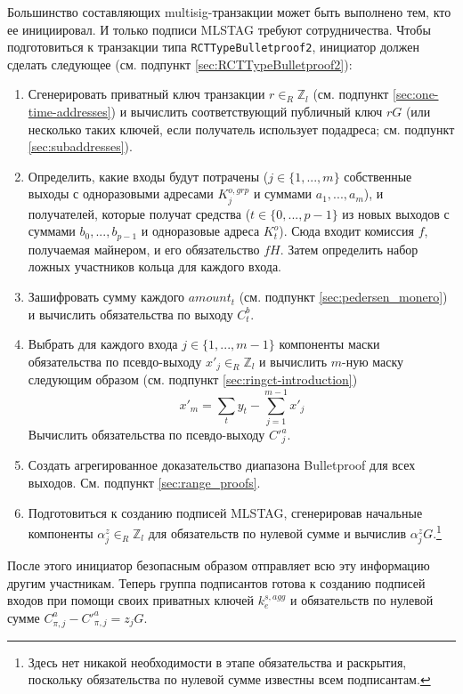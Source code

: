 Большинство составляющих multisig-транзакции может быть выполнено тем, кто ее иниции\-ровал. И только подписи MLSTAG требуют сотрудничества. Чтобы подготовиться к транзак\-ции типа {\tt RCTTypeBulletproof2}, инициатор должен сделать следующее (см. подпункт \ref{sec:RCTTypeBulletproof2}):
\begin{enumerate}
    \item Сгенерировать приватный ключ транзакции $r \in_R \mathbb{Z}_l$ (см. подпункт \ref{sec:one-time-addresses}) и вычислить соответствующий публичный ключ $r G$ (или несколько таких ключей, если получатель использует подадреса; см. подпункт \ref{sec:subaddresses}).
    \item Определить, какие входы будут потрачены ($j \in \{1,...,m\}$ собственные выходы с однора\-зовыми адресами $K^{o,grp}_j$ и суммами $a_1,...,a_m$), и получателей, которые получат средства ($t \in \{0,...,p-1\}$ из новых выходов с суммами $b_0,...,b_{p-1}$ и одноразовые адреса $K^{o}_t$). Сюда входит комиссия $f$, получаемая майнером, и его обязательство $f H$. Затем определить набор ложных участников кольца для каждого входа.
    \item Зашифровать сумму каждого $\mathit{amount}_t$ (см. подпункт \ref{sec:pedersen_monero}) и вычислить обязательства по выходу $C^b_t$.
    \item Выбрать для каждого входа $j \in \{1,...,m-1\}$ компоненты маски обязательства по псевдо-выходу $x'_{j} \in_R \mathbb{Z}_l$ и вычислить $m$-ную маску следующим образом (см. подпункт \ref{sec:ringct-introduction})
    \[x'_m = \sum_t y_t - \sum_{j=1}^{m-1} x'_j\]
    Вычислить обязательства по псевдо-выходу $C'^a_{j}$.
    \item Создать агрегированное доказательство диапазона Bulletproof для всех выходов. См. подпункт \ref{sec:range_proofs}.
    \item Подготовиться к созданию подписей MLSTAG, сгенерировав начальные компоненты $\alpha^z_{j} \in_R \mathbb{Z}_l$ для обязательств по нулевой сумме и вычислив $\alpha^z_{j} G$.\footnote{Здесь нет никакой необходимости в этапе обязательства и раскрытия, поскольку обязательства по нулевой сумме известны всем подписантам.}
\end{enumerate}

После этого инициатор безопасным образом отправляет всю эту информацию другим участ\-никам. Теперь группа подписантов готова к созданию подписей входов при помощи своих приватных ключей $k^{s,agg}_e$ и обязательств по нулевой сумме $C^a_{\pi,j} - C'^a_{\pi,j} = z_j G$.

